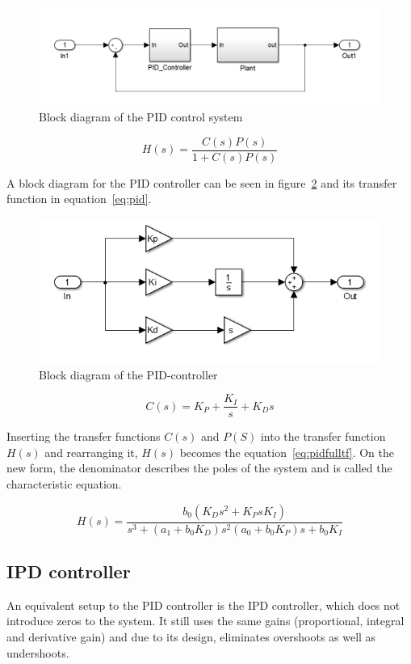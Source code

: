 \begin{figure}[!h]
	\centering
	\includegraphics[width=.75\linewidth]{graphics/controlsystem}
	\caption{Block diagram of the PID control system}
	\label{fig:pidcontrolsystem}	
\end{figure}

\begin{equation}
\label{eq:tfpidsystem}
H(s) = \dfrac{C(s)P(s)}{1+C(s)P(s)}
\end{equation}

A block diagram for the PID controller can be seen in figure~\ref{fig:pidblock} and its transfer function in equation~\ref{eq:pid}.  

\begin{figure}[!h]
	\centering
	\includegraphics[width=.7\linewidth]{graphics/pidcontroller}
	\caption{Block diagram of the PID-controller}
	\label{fig:pidblock}
\end{figure}

\begin{equation}
\label{eq:pid}
C(s) = K_P + \dfrac{K_I}{s} +K_D s
\end{equation}

Inserting the transfer functions $C(s)$ and $P(S)$ into the transfer function $H(s)$ and rearranging it, $H(s)$ becomes the equation~\ref{eq:pidfulltf}. On the new form, the denominator describes the poles of the system and is called the characteristic equation.

\begin{equation}
\label{eq:pidfulltf}
H(s) = \dfrac{b_0 (K_D s^2 + K_P s K_I)}{s^3 + (a_1 + b_0 K_D)s^2 (a_0 + b_0 K_P)s + b_0 K_I }
\end{equation}


\subsection{IPD controller}
An equivalent setup to the PID controller is the IPD controller, which does not introduce zeros to the system. It still uses the same gains (proportional, integral and derivative gain) and due to its design, eliminates overshoots as well as undershoots.

